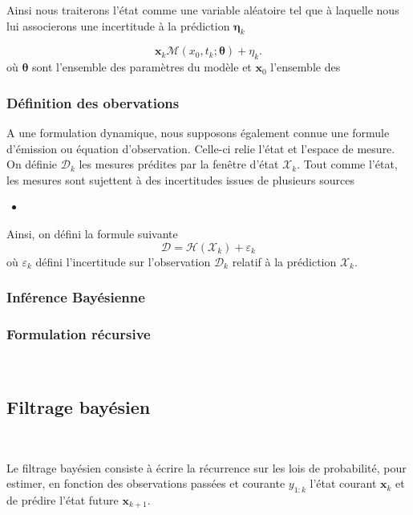 Ainsi nous traiterons l'état comme une variable aléatoire tel que à laquelle nous lui associerons une incertitude à la prédiction $\bm \eta_k$

\begin{equation*}
    \bm x_k \mathcal{M}(x_0, t_k ; \bm \theta) + \eta_k.
\end{equation*}
où $\bm \theta$ sont l'ensemble des paramètres du modèle et $\bm x_0$ l'ensemble des

\subsubsection{Définition des obervations}
A une formulation dynamique, nous supposons également connue une formule d'émission ou équation d'observation. Celle-ci relie l'état et l'espace de mesure. On définie $\mathcal{D}_k$ les mesures prédites par la fenêtre d'état $\mathcal{X}_k$. Tout comme l'état, les mesures sont sujettent à des incertitudes issues de plusieurs sources

\begin{itemize}
    \item {}
\end{itemize}

Ainsi, on défini la formule suivante
\begin{equation*}
    \mathcal D = \mathcal H (\mathcal{X}_k) + \mathcal{\varepsilon}_k
\end{equation*} où $\mathcal{\varepsilon}_k$ défini l'incertitude sur l'observation $\mathcal D_k$ relatif à la prédiction $\mathcal{X}_k$.

\subsubsection{Inférence Bayésienne}

\subsubsection{Formulation récursive}~\label{hidden_mc}

\subsection{Filtrage bayésien}~\label{filtrage_bayesien}

Le filtrage bayésien consiste à écrire la récurrence sur les lois de probabilité, pour estimer, en fonction des observations passées et courante $y_{1:k}$ l'état courant $\bm x_k$ et de prédire l'état future $\bm x_{k+1}$.


